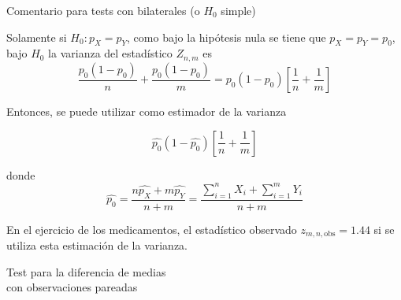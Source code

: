 \documentclass{beamer}
\theoremstyle{definition}
\begin{document}
\begin{frame}{\color{rosee} Comentario para tests con bilaterales (o $H_0$ simple)}

Solamente si $H_0: p_X=p_Y$, como bajo la hip\'otesis nula se tiene que $p_X=p_Y=p_0$, bajo $H_0$ la varianza del estadístico $Z_{n,m}$ es \[\dfrac{p_0(1-p_0)}{n}+\dfrac{p_0(1-p_0)}{m}=p_0(1-p_0)\left[\dfrac{1}{n}+\frac{1}{m}\right]\]

\medskip

Entonces, se puede utilizar como estimador de la varianza

\[\widehat{p_0}\left(1-\widehat{p_0}\right)\left[\dfrac{1}{n}+\frac{1}{m}\right]\]
    
 \medskip
 
\noindent donde \[\widehat{p_0}=\dfrac{n\widehat{p_X}+m\widehat{p_Y}}{n+m}=\dfrac{\displaystyle\sum_{i=1}^{n}X_i+\displaystyle\sum_{i=1}^{m}Y_i}{n+m}\]

En el ejercicio de los medicamentos, el estad\'istico observado $z_{m,n, \text{obs}}=1.44$ si se utiliza esta estimaci\'on de la varianza.
\end{frame}

\begin{frame}{\color{rosee}}
  \begin{center}
   \Large Test para la diferencia de medias\\ con observaciones \textcolor{rosee}{pareadas}
 \end{center}
\end{frame}
\end{document}
